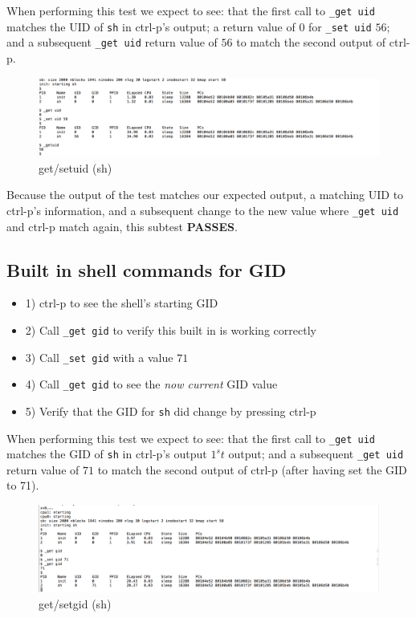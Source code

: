 \documentclass[11pt,letterpaper]{report}
\begin{document}
	When performing this test we expect to see: that the first call to {\tt \_get uid} matches the UID of {\tt sh} in ctrl-p's output; a return value of 0 for {\tt \_set uid} $56$; and a 
	subsequent {\tt \_get uid} return value of $56$ to match the second output of ctrl-p.

\begin{figure}[h!]
\centering
\includegraphics[width=0.8\linewidth]{shell-uid.png}
\caption[get/setuid (sh)]{get/setuid (sh)}
\label{fig:get/setuid}
\end{figure}

	Because the output of the test matches our expected output, a matching UID to ctrl-p's information, and a subsequent change to the new value where {\tt \_get uid} and 
	ctrl-p match again, this subtest \textbf{PASSES}.


\subsection*{Built in shell commands for GID}	
	\begin{itemize}
			\item 1) ctrl-p to see the shell's starting GID
				
			\item 2) Call {\tt \_get gid} to verify this built in is working correctly
			
			\item 3) Call {\tt \_set gid} with a value $71$
			
			\item 4) Call {\tt \_get gid} to see the \emph{now current} GID value
			
			\item 5) Verify that the GID for {\tt sh} did change by pressing ctrl-p

	\end{itemize}
	
	When performing this test we expect to see: that the first call to {\tt \_get uid} matches the GID of {\tt sh} in ctrl-p's output $1^st$ output;  and a 
	subsequent {\tt \_get uid} return value of $71$ to match the second output of ctrl-p (after having set the GID to 71).


\begin{figure}[h!]
\centering
\includegraphics[width=0.7\linewidth]{shell-gid.png}
\caption[get/setgid (sh)]{get/setgid (sh)}
\label{fig:get/setgid (sh)}
\end{figure}
\end{document}

